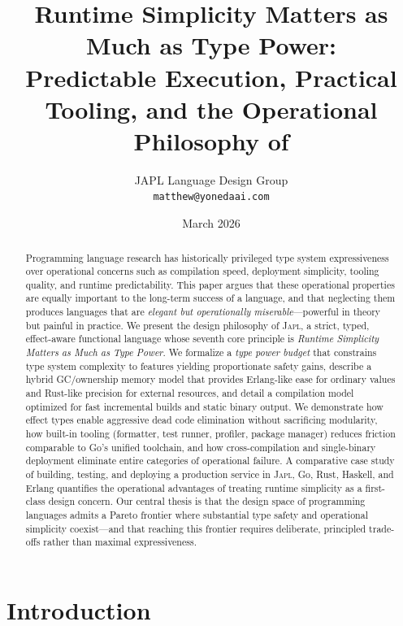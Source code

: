 \documentclass[11pt,twocolumn]{article}
\title{\textbf{Runtime Simplicity Matters as Much as Type Power:} \\
\large Predictable Execution, Practical Tooling, and the Operational Philosophy of \japl{}}
\author{
  JAPL Language Design Group \\
  \texttt{matthew@yonedaai.com}
}
\date{March 2026}
\newcommand{\japl}{\textsc{Japl}}
\begin{document}
\maketitle

\begin{abstract}
Programming language research has historically privileged type system expressiveness over operational concerns such as compilation speed, deployment simplicity, tooling quality, and runtime predictability.
This paper argues that these operational properties are equally important to the long-term success of a language, and that neglecting them produces languages that are \emph{elegant but operationally miserable}---powerful in theory but painful in practice.
We present the design philosophy of \japl{}, a strict, typed, effect-aware functional language whose seventh core principle is \emph{Runtime Simplicity Matters as Much as Type Power}.
We formalize a \emph{type power budget} that constrains type system complexity to features yielding proportionate safety gains, describe a hybrid GC/ownership memory model that provides Erlang-like ease for ordinary values and Rust-like precision for external resources, and detail a compilation model optimized for fast incremental builds and static binary output.
We demonstrate how effect types enable aggressive dead code elimination without sacrificing modularity, how built-in tooling (formatter, test runner, profiler, package manager) reduces friction comparable to Go's unified toolchain, and how cross-compilation and single-binary deployment eliminate entire categories of operational failure.
A comparative case study of building, testing, and deploying a production service in \japl{}, Go, Rust, Haskell, and Erlang quantifies the operational advantages of treating runtime simplicity as a first-class design concern.
Our central thesis is that the design space of programming languages admits a Pareto frontier where substantial type safety and operational simplicity coexist---and that reaching this frontier requires deliberate, principled trade-offs rather than maximal expressiveness.
\end{abstract}

\section{Introduction}
\label{sec:introduction}
\end{document}
